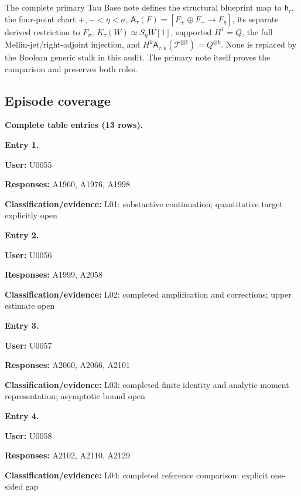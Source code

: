 The complete primary Tau Base note defines the structural blueprint map
to \(\mathfrak b_\tau\), the four-point chart \(+,-<\eta<\sigma\),
\(\mathsf A_\tau(F)=[F_+\oplus F_-\to F_\eta]\), its separate derived
restriction to \(F_\sigma\), \(K_\tau(W)\simeq S_\eta W[1]\), supported
\(H^1=Q\), the full Mellin-jet/right-adjoint injection, and
\(H^k\mathsf A_{\tau,k}(\mathcal T^{\boxtimes k})=Q^{\otimes k}\). None
is replaced by the Boolean generic stalk in this audit. The primary note
itself proves the comparison and preserves both roles.

\subsection{Episode coverage}\label{TranscriptLedgerStage:episode-coverage}

\textbf{Complete table entries (13 rows).}


\textbf{Entry 1.}

\textbf{User:} U0055

\textbf{Responses:} A1960, A1976, A1998

\textbf{Classification/evidence:} L01: substantive continuation;
quantitative target explicitly open


\textbf{Entry 2.}

\textbf{User:} U0056

\textbf{Responses:} A1999, A2058

\textbf{Classification/evidence:} L02: completed amplification and
corrections; upper estimate open


\textbf{Entry 3.}

\textbf{User:} U0057

\textbf{Responses:} A2060, A2066, A2101

\textbf{Classification/evidence:} L03: completed finite identity and
analytic moment representation; asymptotic bound open


\textbf{Entry 4.}

\textbf{User:} U0058

\textbf{Responses:} A2102, A2110, A2129

\textbf{Classification/evidence:} L04: completed reference comparison;
explicit one-sided gap


